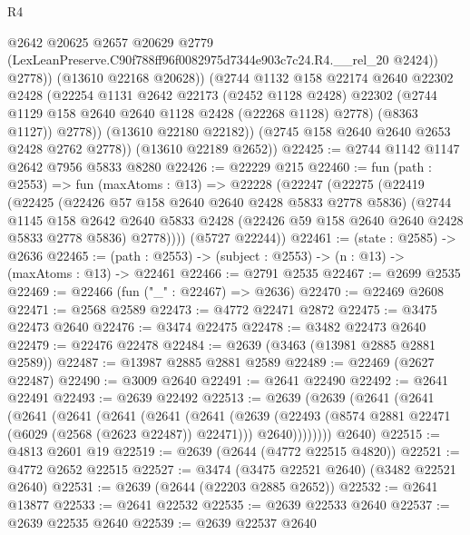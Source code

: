 \begin{lexlean}{R4}
\begin{coremodule}
                    @2642
                    @20625
                    @2657
                    @20629
                    @2779
                    (LexLeanPreserve.C90f788ff96f0082975d7344e903c7c24.R4.__rel_20 @2424))
                  @2778))
              (@13610 @22168 @20628))
            (@2744
              @1132
              @158
              @22174
              @2640
              @22302
              @2428
              (@22254
                @1131
                @2642
                @22173
                (@2452 @1128 @2428)
                @22302
                (@2744 @1129 @158 @2640 @2640 @1128 @2428 (@22268 @1128) @2778)
                (@8363 @1127))
              @2778))
          (@13610 @22180 @22182))
        (@2745 @158 @2640 @2640 @2653 @2428 @2762 @2778))
      (@13610 @22189 @2652))
@22425 := @2744 @1142 @1147 @2642 @7956 @5833 @8280
@22426 := @22229 @215
@22460 := fun (path : @2553) =>
  fun (maxAtoms : @13) =>
  @22228
    (@22247
      (@22275
        (@22419
          (@22425
            (@22426 @57 @158 @2640 @2640 @2428 @5833 @2778 @5836)
            (@2744
              @1145
              @158
              @2642
              @2640
              @5833
              @2428
              (@22426 @59 @158 @2640 @2640 @2428 @5833 @2778 @5836)
              @2778))))
      (@5727 @22244))
@22461 := (state : @2585) -> @2636
@22465 := (path : @2553) -> (subject : @2553) -> (n : @13) -> (maxAtoms : @13) -> @22461
@22466 := @2791 @2535
@22467 := @2699 @2535
@22469 := @22466 (fun ("_" : @22467) => @2636)
@22470 := @22469 @2608
@22471 := @2568 @2589
@22473 := @4772 @22471 @2872
@22475 := @3475 @22473 @2640
@22476 := @3474 @22475
@22478 := @3482 @22473 @2640
@22479 := @22476 @22478
@22484 := @2639 (@3463 (@13981 @2885 @2881 @2589))
@22487 := @13987 @2885 @2881 @2589
@22489 := @22469 (@2627 @22487)
@22490 := @3009 @2640
@22491 := @2641 @22490
@22492 := @2641 @22491
@22493 := @2639 @22492
@22513 := @2639
    (@2639
      (@2641
        (@2641
          (@2641
            (@2641
              (@2641
                (@2641
                  (@2641
                    (@2639
                      (@22493 (@8574 @2881 @22471 (@6029 (@2568 (@2623 @22487)) @22471)))
                      @2640))))))))
      @2640)
@22515 := @4813 @2601 @19
@22519 := @2639 (@2644 (@4772 @22515 @4820))
@22521 := @4772 @2652 @22515
@22527 := @3474 (@3475 @22521 @2640) (@3482 @22521 @2640)
@22531 := @2639 (@2644 (@22203 @2885 @2652))
@22532 := @2641 @13877
@22533 := @2641 @22532
@22535 := @2639 @22533 @2640
@22537 := @2639 @22535 @2640
@22539 := @2639 @22537 @2640

\end{coremodule}
\end{lexlean}
